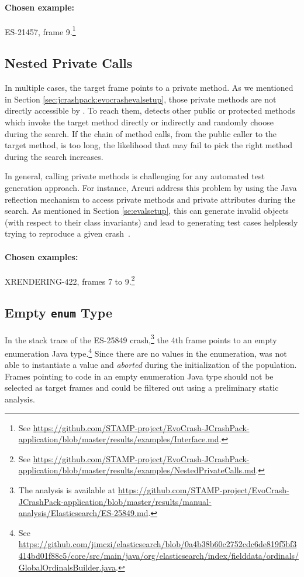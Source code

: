 \paragraph{Chosen example:}
ES-21457, frame 9.\footnote{See \url{https://github.com/STAMP-project/EvoCrash-JCrashPack-application/blob/master/results/examples/Interface.md}.}


\subsection{Nested Private Calls}

In multiple cases, the target frame points to a private method. As we mentioned in Section \ref{sec:jcrashpack:evocrashevalsetup}, those private methods are not directly accessible by \evocrash. 
To reach them, \evocrash detects other public or protected methods which invoke the target method directly or indirectly and randomly choose during the search. 
If the chain of method calls, from the public caller to the target method, is too long, the likelihood that \evocrash may fail to pick the right method during the search increases.

In general, calling private methods is challenging for any automated test generation approach.
For instance, Arcuri \etal \cite{arcuri2017private} address this problem by using the Java reflection mechanism to access private methods and private attributes during the search. 
As mentioned in Section \ref{se:evalsetup}, this can generate invalid objects (with respect to their class invariants) and lead to generating test cases helplessly trying to reproduce a given crash~\cite{Chen2015}.

\paragraph{Chosen examples:} 
XRENDERING-422, frames 7 to 9.\footnote{See \url{https://github.com/STAMP-project/EvoCrash-JCrashPack-application/blob/master/results/examples/NestedPrivateCalls.md}.}


\subsection{Empty \texttt{enum} Type}

In the stack trace of the ES-25849 crash,\footnote{The analysis is available at \url{https://github.com/STAMP-project/EvoCrash-JCrashPack-application/blob/master/results/manual-analysis/Elasticsearch/ES-25849.md}.} 
the 4th frame points to an empty enumeration Java type.\footnote{See \url{https://github.com/jimczi/elasticsearch/blob/0a4b38b60c2752cdc6de819f5bf3414bd01f88c5/core/src/main/java/org/elasticsearch/index/fielddata/ordinals/GlobalOrdinalsBuilder.java}.} 
Since there are no values in the enumeration, \evocrash was not able to instantiate a value and \emph{aborted} during the initialization of the population.
Frames pointing to code in an empty enumeration Java type should not be selected as target frames and could be filtered out using a preliminary static analysis.

